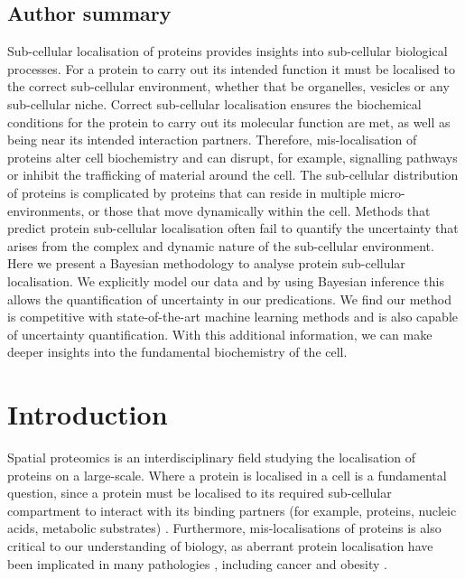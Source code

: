 \documentclass[12pt,english]{article}
\begin{document}
\subsection*{Author summary}

Sub-cellular localisation of proteins provides insights into
sub-cellular biological processes. For a protein to carry out its
intended function it must be localised to the correct sub-cellular
environment, whether that be organelles, vesicles or any sub-cellular
niche. Correct sub-cellular localisation ensures the biochemical
conditions for the protein to carry out its molecular function are
met, as well as being near its intended interaction
partners. Therefore, mis-localisation of proteins alter cell
biochemistry and can disrupt, for example, signalling pathways or
inhibit the trafficking of material around the cell. The sub-cellular
distribution of proteins is complicated by proteins that can reside in
multiple micro-environments, or those that move dynamically within the
cell. Methods that predict protein sub-cellular localisation often
fail to quantify the uncertainty that arises from the complex and
dynamic nature of the sub-cellular environment. Here we present a
Bayesian methodology to analyse protein sub-cellular localisation. We
explicitly model our data and by using Bayesian inference this allows
the quantification of uncertainty in our predications. We find our
method is competitive with state-of-the-art machine learning methods
and is also capable of uncertainty quantification. With this
additional information, we can make deeper insights into the
fundamental biochemistry of the cell.


\section{Introduction}\label{Intro}

Spatial proteomics is an interdisciplinary field studying the
localisation of proteins on a large-scale. Where a protein is localised in a cell is
a fundamental question, since a protein must be
localised to its required sub-cellular compartment to interact
with its binding partners (for example, proteins, nucleic acids,
metabolic substrates) \citep{Gibson:2009}. Furthermore, mis-localisations of proteins
is also critical to our understanding of
biology, as aberrant protein localisation have been implicated in
many pathologies \citep{Olkkonen:2006, Laurila:2009, Luheshi:2008, De:2011, Cody:2013},
including cancer \citep{Kau:2004, Rodriguez:2004, Latorre:2005, Shin:2013} and obesity
\citep{Siljee:2018}.
\end{document}

